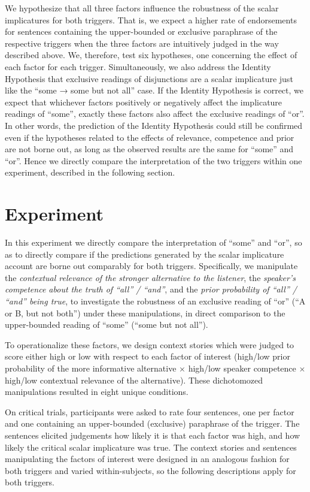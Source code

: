 \documentclass{sp}
\begin{document}
We hypothesize that all three factors influence the robustness of the scalar implicatures for both triggers. That is, we expect a higher rate of endorsements for sentences containing the upper-bounded or exclusive paraphrase of the respective triggers when the three factors are intuitively judged in the way described above. We, therefore, test six hypotheses, one concerning the effect of each factor for each trigger. 
Simultaneously,  we also address the Identity Hypothesis that exclusive readings of disjunctions are a scalar implicature just like the ``some → some but not all'' case. If the Identity Hypothesis is correct, we expect that whichever factors positively or negatively affect the implicature readings of ``some'', exactly these factors also affect the exclusive readings of ``or''. In other words, the prediction of the Identity Hypothesis could still be confirmed even if the hypotheses related to the effects of relevance, competence and prior are not borne out, as long as the observed results are the same for ``some'' and ``or''. Hence we directly compare the interpretation of the two triggers within one experiment, described in the following section.

\section{Experiment}

In this experiment we directly compare the interpretation of ``some'' and ``or'', so as to directly compare if the predictions generated by the scalar implicature account are borne out comparably for both triggers. Specifically, we manipulate the \textit{contextual relevance of the stronger alternative to the listener}, the \textit{speaker's competence about the truth of ``all'' / ``and''}, and the \textit{prior probability of ``all'' / ``and'' being true}, to investigate the robustness of an exclusive reading of ``or'' (``A or B, but not both'') under these manipulations, in direct comparison to the upper-bounded reading of “some” (``some but not all'').

To operationalize these factors, we design context stories which were judged to score either high or low with respect to each factor of interest (high/low prior probability of the more informative alternative $\times$ high/low speaker competence $\times$ high/low contextual relevance of the alternative). These dichotomozed manipulations resulted in eight unique conditions. 

On critical trials, participants were asked to rate four sentences, one per factor and one containing an upper-bounded (exclusive) paraphrase of the trigger. The sentences elicited judgements how likely it is that each factor was high, and how likely the critical scalar implicature was true. The context stories and sentences manipulating the factors of interest were designed in an analogous fashion for both triggers and varied within-subjects, so the following descriptions apply for both triggers.
\end{document}
